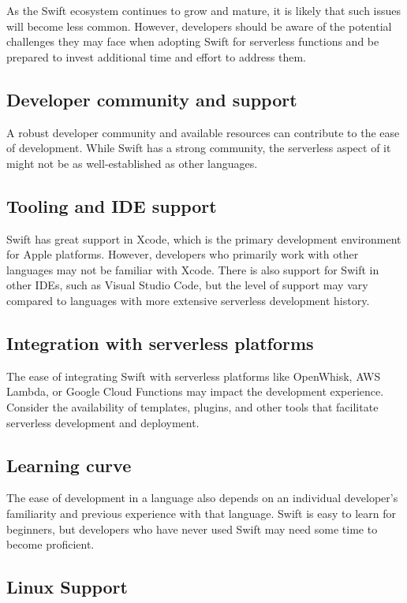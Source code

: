 As the Swift ecosystem continues to grow and mature, it is likely that such issues will become less common. However, developers should be aware of the potential challenges they may face when adopting Swift for serverless functions and be prepared to invest additional time and effort to address them.

\subsection{Developer community and support}

A robust developer community and available resources can contribute to the ease of development. While Swift has a strong community, the serverless aspect of it might not be as well-established as other languages.

\subsection{Tooling and IDE support}

Swift has great support in Xcode, which is the primary development environment for Apple platforms. However, developers who primarily work with other languages may not be familiar with Xcode. There is also support for Swift in other IDEs, such as Visual Studio Code, but the level of support may vary compared to languages with more extensive serverless development history.

\subsection{Integration with serverless platforms}

The ease of integrating Swift with serverless platforms like OpenWhisk, AWS Lambda, or Google Cloud Functions may impact the development experience. Consider the availability of templates, plugins, and other tools that facilitate serverless development and deployment.

\subsection{Learning curve}

The ease of development in a language also depends on an individual developer's familiarity and previous experience with that language. Swift is easy to learn for beginners, but developers who have never used Swift may need some time to become proficient.
    
\subsection{Linux Support}

